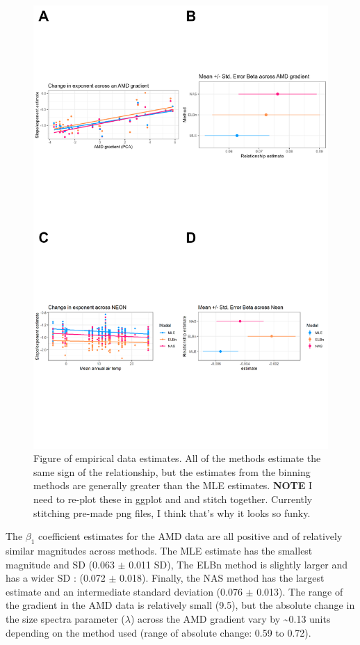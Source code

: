 \documentclass[
]{article}
\begin{document}
\newpage

\begin{figure}
\centering
\includegraphics{figures/empirical_combined.png}
\caption{Figure of empirical data estimates. All of the methods estimate
the same sign of the relationship, but the estimates from the binning
methods are generally greater than the MLE estimates. \textbf{NOTE} I
need to re-plot these in ggplot and and stitch together. Currently
stitching pre-made png files, I think that's why it looks so funky.}
\end{figure}

\newpage

The \(\beta_1\) coefficient estimates for the AMD data are all positive
and of relatively similar magnitudes across methods. The MLE estimate
has the smallest magnitude and SD (0.063 \(\pm\) 0.011 SD), The ELBn
method is slightly larger and has a wider SD : (0.072 \(\pm\) 0.018).
Finally, the NAS method has the largest estimate and an intermediate
standard deviation (0.076 \(\pm\) 0.013). The range of the gradient in
the AMD data is relatively small (9.5), but the absolute change in the
size spectra parameter (\(\lambda\)) across the AMD gradient vary by
\textasciitilde0.13 units depending on the method used (range of
absolute change: 0.59 to 0.72).
\end{document}
